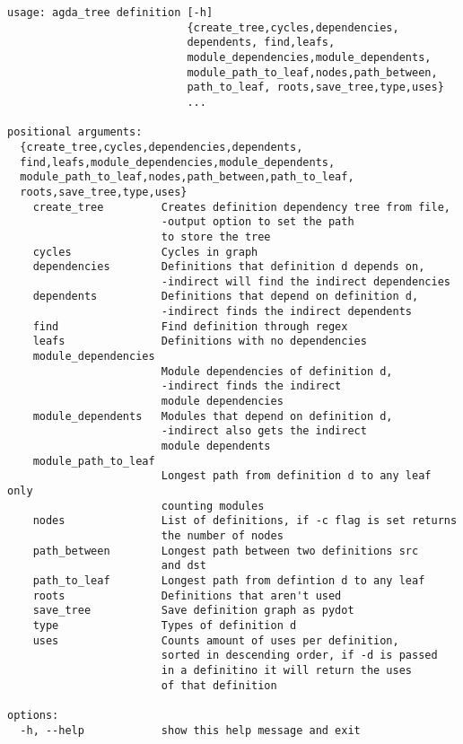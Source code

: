 \begin{lstlisting}[caption={Agda Tree Definition Help Message},label={code:definition help}]
usage: agda_tree definition [-h]
                            {create_tree,cycles,dependencies,
                            dependents, find,leafs,
                            module_dependencies,module_dependents,
                            module_path_to_leaf,nodes,path_between,
                            path_to_leaf, roots,save_tree,type,uses}
                            ...

positional arguments:
  {create_tree,cycles,dependencies,dependents,
  find,leafs,module_dependencies,module_dependents,
  module_path_to_leaf,nodes,path_between,path_to_leaf,
  roots,save_tree,type,uses}
    create_tree         Creates definition dependency tree from file, 
                        -output option to set the path 
                        to store the tree
    cycles              Cycles in graph
    dependencies        Definitions that definition d depends on,
                        -indirect will find the indirect dependencies
    dependents          Definitions that depend on definition d,
                        -indirect finds the indirect dependents
    find                Find definition through regex
    leafs               Definitions with no dependencies
    module_dependencies
                        Module dependencies of definition d, 
                        -indirect finds the indirect 
                        module dependencies
    module_dependents   Modules that depend on definition d, 
                        -indirect also gets the indirect 
                        module dependents
    module_path_to_leaf
                        Longest path from definition d to any leaf only
                        counting modules
    nodes               List of definitions, if -c flag is set returns 
                        the number of nodes
    path_between        Longest path between two definitions src 
                        and dst
    path_to_leaf        Longest path from defintion d to any leaf
    roots               Definitions that aren't used
    save_tree           Save definition graph as pydot
    type                Types of definition d
    uses                Counts amount of uses per definition, 
                        sorted in descending order, if -d is passed 
                        in a definitino it will return the uses 
                        of that definition

options:
  -h, --help            show this help message and exit
\end{lstlisting}

